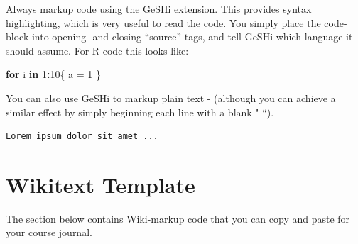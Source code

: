 \documentclass[]{book}
\newenvironment{Shaded}{\begin{snugshade}}{\end{snugshade}}
\newcommand{\DecValTok}[1]{\textcolor[rgb]{0.00,0.00,0.81}{#1}}
\newcommand{\StringTok}[1]{\textcolor[rgb]{0.31,0.60,0.02}{#1}}
\newcommand{\ControlFlowTok}[1]{\textcolor[rgb]{0.13,0.29,0.53}{\textbf{#1}}}
\newcommand{\OperatorTok}[1]{\textcolor[rgb]{0.81,0.36,0.00}{\textbf{#1}}}
\newcommand{\NormalTok}[1]{#1}
\begin{document}
Always markup code using the GeSHi extension. This provides syntax
highlighting, which is very useful to read the code. You simply place
the code-block into opening- and closing ``source'' tags, and tell GeSHi
which language it should assume. For R-code this looks like:

\begin{Shaded}
\begin{Highlighting}[]
\ControlFlowTok{for}\NormalTok{ i }\ControlFlowTok{in} \DecValTok{1}\OperatorTok{:}\DecValTok{10}\NormalTok{\{}
\NormalTok{  a =}\StringTok{ }\DecValTok{1}
\NormalTok{\}}
\end{Highlighting}
\end{Shaded}

You can also use GeSHi to markup plain text - (although you can achieve
a similar effect by simply beginning each line with a blank " ``).

\begin{verbatim}
Lorem ipsum dolor sit amet ...
\end{verbatim}

\section{Wikitext Template}\label{wikitext-template}

The section below contains Wiki-markup code that you can copy and paste
for your course journal.
\end{document}
